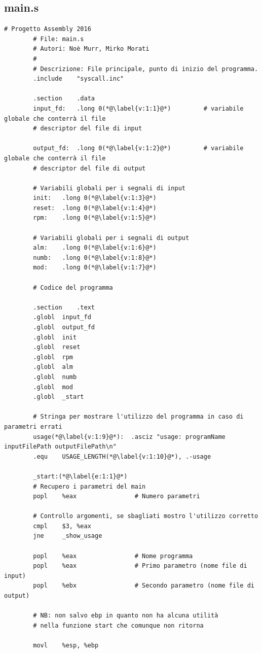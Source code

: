 \documentclass[a4paper,11pt]{article}
\begin{document}
		\subsection{main.s}
		\begin{lstlisting}[language=MyAssembler, style=MyAsm]
		# Progetto Assembly 2016
		# File: main.s
		# Autori: Noè Murr, Mirko Morati
		#
		# Descrizione: File principale, punto di inizio del programma.
		.include    "syscall.inc"
		
		.section    .data
		input_fd:   .long 0(*@\label{v:1:1}@*)         # variabile globale che conterrà il file
		# descriptor del file di input
		
		output_fd:  .long 0(*@\label{v:1:2}@*)         # variabile globale che conterrà il file
		# descriptor del file di output
		
		# Variabili globali per i segnali di input
		init:   .long 0(*@\label{v:1:3}@*)
		reset:  .long 0(*@\label{v:1:4}@*)
		rpm:    .long 0(*@\label{v:1:5}@*)
		
		# Variabili globali per i segnali di output
		alm:    .long 0(*@\label{v:1:6}@*)
		numb:   .long 0(*@\label{v:1:8}@*)
		mod:    .long 0(*@\label{v:1:7}@*)
		
		# Codice del programma
		
		.section    .text
		.globl  input_fd
		.globl  output_fd
		.globl  init
		.globl  reset
		.globl  rpm
		.globl  alm
		.globl  numb
		.globl  mod
		.globl  _start
		
		# Stringa per mostrare l'utilizzo del programma in caso di parametri errati
		usage(*@\label{v:1:9}@*):  .asciz "usage: programName inputFilePath outputFilePath\n"
		.equ    USAGE_LENGTH(*@\label{v:1:10}@*), .-usage
		
		_start:(*@\label{e:1:1}@*)
		# Recupero i parametri del main
		popl    %eax                # Numero parametri
		
		# Controllo argomenti, se sbagliati mostro l'utilizzo corretto
		cmpl    $3, %eax
		jne     _show_usage
		
		popl    %eax                # Nome programma
		popl    %eax                # Primo parametro (nome file di input)
		popl    %ebx                # Secondo parametro (nome file di output)
		
		# NB: non salvo ebp in quanto non ha alcuna utilità
		# nella funzione start che comunque non ritorna
		
		movl    %esp, %ebp
		

\end{lstlisting}
\end{document}
